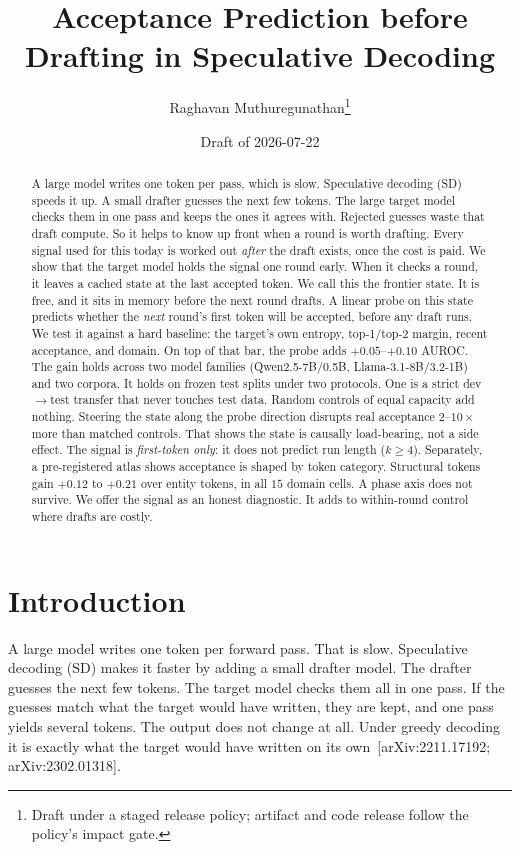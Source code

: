 \documentclass[11pt]{article}
\title{\textbf{Acceptance Prediction before Drafting in Speculative Decoding}}
\author{Raghavan Muthuregunathan\thanks{Draft under a staged release policy;
artifact and code release follow the policy's impact gate.}}
\date{Draft of 2026-07-22}
\begin{document}
\maketitle

\begin{abstract}
A large model writes one token per pass, which is slow. Speculative decoding
(SD) speeds it up. A small drafter guesses the next few tokens. The large target
model checks them in one pass and keeps the ones it agrees with. Rejected
guesses waste that draft compute. So it helps to know up front when a round is
worth drafting. Every signal used for this today is worked out \emph{after} the
draft exists, once the cost is paid. We show that the target model holds the
signal one round early. When it checks a round, it leaves a cached state at the
last accepted token. We call this the frontier state. It is free, and it sits in
memory before the next round drafts. A linear probe on this state predicts
whether the \emph{next} round's first token will be accepted, before any draft
runs. We test it against a hard baseline: the target's own entropy, top-1/top-2
margin, recent acceptance, and domain. On top of that bar, the probe adds
$+0.05$--$+0.10$ AUROC. The gain holds across two model families
(Qwen2.5-7B/0.5B, Llama-3.1-8B/3.2-1B) and two corpora. It holds on frozen test
splits under two protocols. One is a strict dev$\to$test transfer that never
touches test data. Random controls of equal capacity add nothing. Steering the
state along the probe direction disrupts real acceptance $2$--$10\times$ more
than matched controls. That shows the state is causally load-bearing, not a side
effect. The signal is \emph{first-token only}: it does not predict run length
($k\ge4$). Separately, a pre-registered atlas shows acceptance is shaped by token
category. Structural tokens gain $+0.12$ to $+0.21$ over entity tokens, in all
$15$ domain cells. A phase axis does not survive. We offer the signal as an
honest diagnostic. It adds to within-round control where drafts are costly.
\end{abstract}

\section{Introduction}
\label{sec:intro}

A large model writes one token per forward pass. That is slow. Speculative
decoding (SD) makes it faster by adding a small drafter model. The drafter
guesses the next few tokens. The target model checks them all in one pass. If
the guesses match what the target would have written, they are kept, and one
pass yields several tokens. The output does not change at all. Under greedy
decoding it is exactly what the target would have written on its
own~[arXiv:2211.17192; arXiv:2302.01318].
\end{document}

